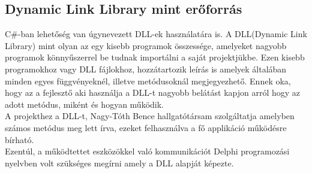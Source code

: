 \documentclass[tocnopagenum]{thesis-ekf}
\theoremstyle{definition}
\theoremstyle{remark}
\begin{document}
	\subsection{Dynamic Link Library mint erőforrás}
	C\#-ban lehetőség van úgynevezett DLL-ek használatára is. A DLL(Dynamic Link Library) mint olyan az egy kisebb programok összessége, amelyeket nagyobb programok könnyűszerrel be tudnak importálni a saját projektjükbe. Ezen kisebb programokhoz vagy DLL fájlokhoz, hozzátartozik leírás is amelyek általában minden egyes függvényeknél, illetve metódusoknál megjegyezhető. Ennek oka, hogy az a fejlesztő aki használja a DLL-t
	nagyobb belátást kapjon arról hogy az adott metódus, miként és hogyan működik.\cite{benlutkevich}
	\\
	A projekthez a DLL-t, Nagy-Tóth Bence hallgatótársam szolgáltatja amelyben számos metódus meg lett írva, ezeket felhasználva a fő applikáció működésre bírható.
	\\
	Ezentúl, a működtettet eszközökkel való kommunikációt Delphi programozási nyelvben volt szükséges megírni amely a DLL alapját képezte. 
	\\
\end{document}
